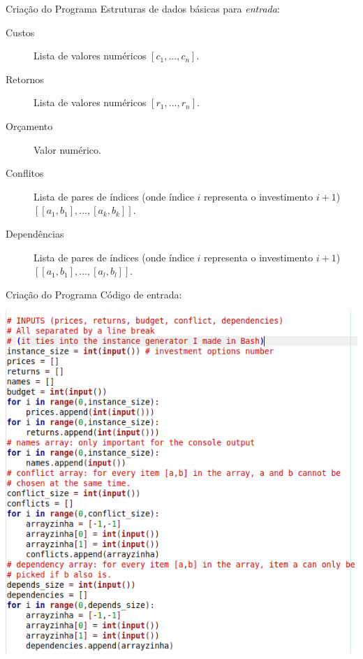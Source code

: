 \documentclass{beamer}
\begin{document}
\begin{frame}{Criação do Programa}
Estruturas de dados básicas para \emph{entrada}:\pause
\begin{description}
\item[Custos] Lista de valores numéricos $[c_1,...,c_n]$.\pause
\item[Retornos] Lista de valores numéricos $[r_1,...,r_n]$.\pause
\item[Orçamento] Valor numérico.\pause
\item[Conflitos] Lista de pares de índices (onde índice $i$ representa o investimento $i+1$) $[[a_1,b_1],...,[a_k,b_k]]$.\pause
\item[Dependências] Lista de pares de índices (onde índice $i$ representa o investimento $i+1$) $[[a_1,b_1],...,[a_l,b_l]]$.
\end{description}
\end{frame}

\begin{frame}{Criação do Programa}
Código de entrada:\pause
\begin{center}
\includegraphics[scale=0.4]{INPUT_CODE_FOR_PRESENTATION.png}
\end{center}
\end{frame}
\end{document}
